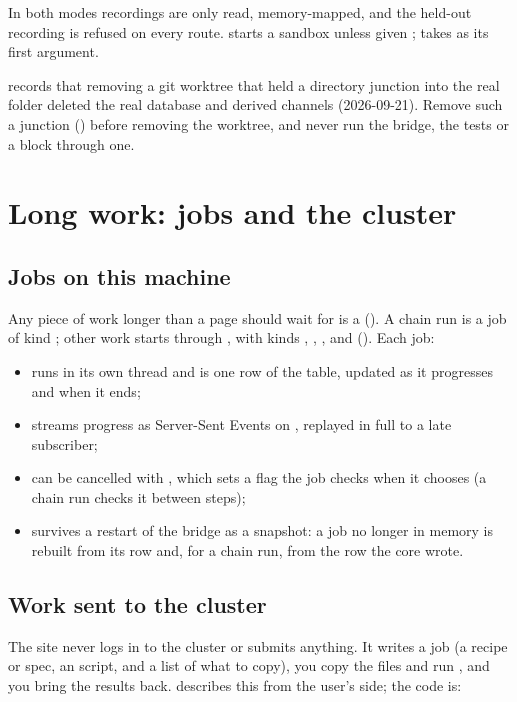 In both modes recordings are only read, memory-mapped, and the held-out recording is refused on
every route.  starts a sandbox unless given ;
 takes  as its first argument.

\begin{watchout}
 records that removing a git worktree that held a directory junction into the
real  folder deleted the real database and derived channels (2026-09-21). Remove such a
junction () before removing the worktree, and never run the bridge, the tests or a
block through one.
\end{watchout}

\section{Long work: jobs and the cluster}\label{sec:architecture-long-work}
\subsection{Jobs on this machine}
Any piece of work longer than a page should wait for is a 
(). A chain run is a job of kind ; other work starts
through , with kinds , ,
,  and  (). Each job:
\begin{itemize}
\item runs in its own thread and is one row of the  table, updated as it progresses
  and when it ends;
\item streams progress as Server-Sent Events on , replayed in full
  to a late subscriber;
\item can be cancelled with , which sets a flag the job checks
  when it chooses (a chain run checks it between steps);
\item survives a restart of the bridge as a snapshot: a job no longer in memory is rebuilt from its
  row and, for a chain run, from the  row the core wrote.
\end{itemize}

\subsection{Work sent to the cluster}
The site never logs in to the cluster or submits anything. It writes a job (a recipe or spec, an
 script, and a list of what to copy), you copy the files and run , and you
bring the results back.  describes this from the user's side; the code is:

